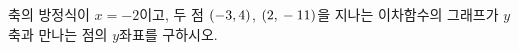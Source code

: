 \hspace*{2mm}\begin{minipage}[t]{\dimexpr\linewidth-2mm\relax}\vspace{0pt}
축의 방정식이 $x=-2$이고, 두 점 $(-3{,}\mkern3mu 4)$, $(2{,}\mkern3mu -11)$을 지나는 이차함수의 그래프가 $y$축과 만나는 점의 $y$좌표를 구하시오.\end{minipage}
